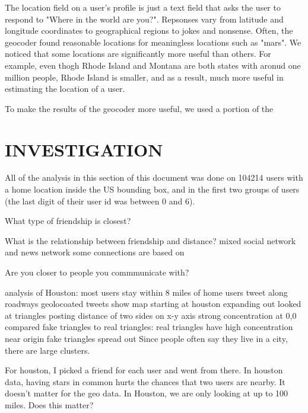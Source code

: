 \documentclass{sig-alternate}
\begin{document}
The location field on a user's profile is just a text field that asks the user to respond to "Where in the world are you?". Repsonses vary from latitude and longitude coordinates to geographical regions to jokes and nonsense. Often, the geocoder found reasonable locations for meaningless locations such as "mars".
We noticed that some locations are significantly more useful than others. For example, even thogh Rhode Island and Montana are both states with aronud one million people, Rhode Island is smaller, and as a result, much more useful in estimating the location of a user.

To make the results of the geocoder more useful, we used a portion of the 

\section{INVESTIGATION}

All of the analysis in this section of this document was done on 104214 users with a home location inside the US bounding box, and in the first two groups of users (the last digit of their user id was between 0 and 6).

What type of friendship is closest?

What is the relationship between friendship and distance?
mixed social network and news network
some connections are based on 

Are you closer to people you commmunicate with?















analysis of Houston:
most users stay within 8 miles of home
users tweet along roadways
geolocoated tweets show map starting at houston expanding out
looked at triangles posting distance of two sides on x-y axis
strong concentration at 0,0
compared fake triangles to real triangles:
    real triangles have high concentration near origin
    fake triangles spread out
Since people often say they live in a city, there are large clusters.

For houston, I picked a friend for each user and went from there.
In houston data, having stars in common hurts the chances that two users are nearby.  It doesn't matter for the geo data. In Houston, we are only looking at up to 100 miles. Does this matter?
\end{document}
